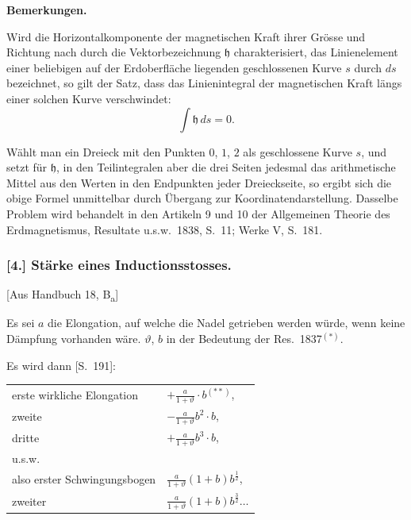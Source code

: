 \documentclass[12pt,a4paper]{article}
\begin{document}
\medskip\noindent
\textbf{Bemerkungen.}

Wird die Horizontalkomponente der magnetischen Kraft ihrer Gr\"osse und Richtung nach durch die Vektorbezeichnung $\mathfrak{h}$ charakterisiert, das Linienelement einer beliebigen auf der Erdoberfl\"ache liegenden geschlossenen Kurve $s$ durch $ds$ bezeichnet, so gilt der Satz, dass das Linienintegral der magnetischen Kraft l\"angs einer solchen Kurve verschwindet:
\[
\int \mathfrak{h} \, ds = 0.
\]

W\"ahlt man ein Dreieck mit den Punkten $0$, $1$, $2$ als geschlossene Kurve $s$, und setzt f\"ur $\mathfrak{h}$, in den Teilintegralen aber die drei Seiten jedesmal das arithmetische Mittel aus den Werten in den Endpunkten jeder Dreieckseite, so ergibt sich die obige Formel unmittelbar durch \"Ubergang zur Koordinatendarstellung. Dasselbe Problem wird behandelt in den Artikeln 9 und 10 der Allgemeinen Theorie des Erdmagnetismus, Resultate u.s.w.~1838, S.~11; Werke V, S.~181.

\subsubsection*{[4.] St\"arke eines Inductionsstosses.}

[Aus Handbuch 18, B\textsubscript{a}]

Es sei $a$ die Elongation, auf welche die Nadel getrieben werden w\"urde, wenn keine D\"ampfung vorhanden w\"are. $\vartheta$, $b$ in der Bedeutung der Res.~1837$^{(*)}$.

Es wird dann [S.~191]:

\begin{center}
\begin{tabular}{ll}
erste wirkliche Elongation & $+\frac{a}{1+\vartheta} \cdot b$$^{(**)}$, \\
\addlinespace
zweite & $-\frac{a}{1+\vartheta} b^2 \cdot b$, \\
\addlinespace
dritte & $+\frac{a}{1+\vartheta} b^3 \cdot b$, \\
\addlinespace
u.s.w. & \\
\addlinespace
also erster Schwingungsbogen & $\frac{a}{1+\vartheta}(1+b)b^{\frac12}$, \\
\addlinespace
zweiter & $\frac{a}{1+\vartheta}(1+b)b^{\frac32} \ldots$
\end{tabular}
\end{center}

\end{document}
